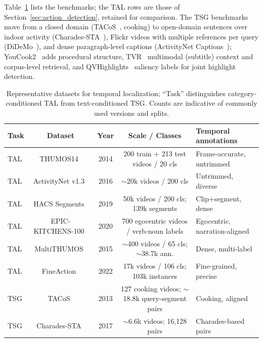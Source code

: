 Table~\ref{tab:temporal_localization_datasets} lists the benchmarks; the TAL rows are those of Section~\ref{sec:action_detection}, retained for comparison. The TSG benchmarks move from a closed domain (TACoS~\cite{tacos2013}, cooking) to open-domain sentences over indoor activity (Charades-STA~\cite{gao2017tall}), Flickr videos with multiple references per query (DiDeMo~\cite{hendricks2017mcn}), and dense paragraph-level captions (ActivityNet Captions~\cite{krishna2017densecap}); YouCook2~\cite{zhou2017youcook2} adds procedural structure, TVR~\cite{lei2020tvr} multimodal (subtitle) context and corpus-level retrieval, and QVHighlights~\cite{lei2021qvhighlights} saliency labels for joint highlight detection.

\begin{table}[t]
\centering
\caption{Representative datasets for temporal localization; ``Task'' distinguishes category-conditioned TAL from text-conditioned TSG. Counts are indicative of commonly used versions and splits.}
\label{tab:temporal_localization_datasets}
\small
\setlength{\tabcolsep}{6pt}
\begin{tabularx}{\linewidth}{@{}l c c c X@{}}
\toprule
\textbf{Task} & \textbf{Dataset} & \textbf{Year} & \textbf{Scale / Classes} & \textbf{Temporal annotations} \\
\midrule
TAL & THUMOS14~\cite{jiang2014thumos} & 2014 & 200 train + 213 test videos / 20 cls & Frame-accurate, untrimmed \\
TAL & ActivityNet v1.3~\cite{caba2015activitynet} & 2016 & $\sim$20k videos / 200 cls & Untrimmed, diverse \\
TAL & HACS Segments~\cite{zhao2019hacs} & 2019 & 50k videos / 200 cls; 139k segments & Clip+segment, dense \\
TAL & EPIC-KITCHENS-100~\cite{damen2020epic100} & 2020 & 700 egocentric videos / verb-noun labels & Egocentric, narration-aligned \\
TAL & MultiTHUMOS~\cite{yeung2018every} & 2015 & $\sim$400 videos / 65 cls; $\sim$38.7k ann. & Dense, multi-label \\
TAL & FineAction~\cite{liu2022fineaction} & 2022 & 17k videos / 106 cls; 103k instances & Fine-grained, precise \\
\midrule
TSG & TACoS~\cite{tacos2013} & 2013 & 127 cooking videos; $\sim$18.8k query-segment pairs & Cooking, aligned \\
TSG & Charades-STA~\cite{gao2017tall} & 2017 & $\sim$6.6k videos; 16,128 pairs & Charades-based pairs \\

\end{tabularx}
\end{table}

